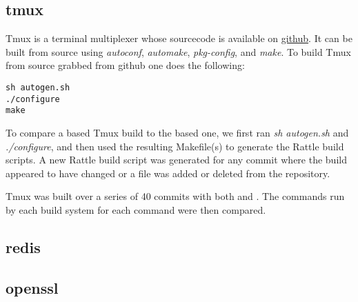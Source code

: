 \subsection{tmux}

Tmux is a terminal multiplexer whose sourcecode is available on  \href{``https://github.com/vim/vim''}{github}.  It can be built from source using \emph{autoconf}, \emph{automake}, \emph{pkg-config}, and \emph{make}.  To build Tmux from source grabbed from github one does the following:

\begin{verbatim}
sh autogen.sh
./configure
make
\end{verbatim}

To compare a \Rattle based Tmux build to the \Make based one, we first ran \emph{sh autogen.sh} and \emph{./configure}, and then used the resulting Makefile(s) to generate the Rattle build scripts.  A new Rattle build script was generated for any commit where the build appeared to have changed or a file was added or deleted from the repository.

Tmux was built over a series of 40 commits with both \Make and \Rattle.  The commands run by each build system for each command were then compared.















\subsection{redis}

\subsection{openssl}
